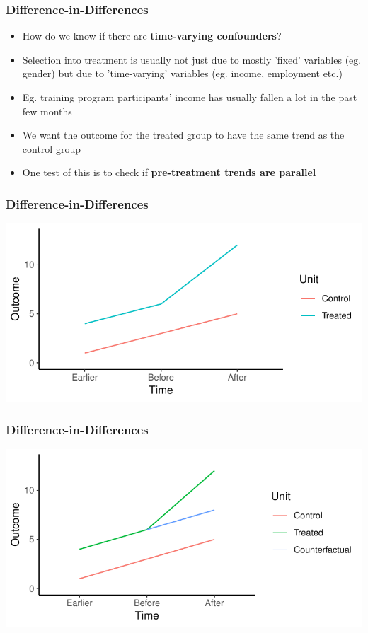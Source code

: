 \documentclass[xcolor=x11names,compress]{beamer}\usepackage[]{graphicx}\usepackage[]{color}
\makeatletter
\def\maxwidth{ %
  \ifdim\Gin@nat@width>\linewidth
    \linewidth
  \else
    \Gin@nat@width
  \fi
}
\newenvironment{knitrout}{}{} %
\renewcommand{\(}{\begin{columns}}
\renewcommand{\)}{\end{columns}}
\newcommand{\<}[1]{\begin{column}{#1}}
\renewcommand{\>}{\end{column}}
\makeatother
\begin{document}
\begin{frame}
\frametitle{Difference-in-Differences}
\begin{itemize}
\item How do we know if there are \textbf{time-varying confounders}?
\pause
\item Selection into treatment is usually not just due to mostly 'fixed' variables (eg. gender) but due to 'time-varying' variables (eg. income, employment etc.)
\pause
\item Eg. training program participants' income has usually fallen a lot in the past few months
\pause
\item We want the outcome for the treated group to have the same trend as the control group
\pause
\item One test of this is to check if \textbf{pre-treatment trends are parallel}
\end{itemize}
\end{frame}

\begin{frame}
\frametitle{Difference-in-Differences}
\begin{knitrout}
\color{fgcolor}
\includegraphics[width=\maxwidth]{figure/DinD_chart6-1} 

\end{knitrout}
\end{frame}

\begin{frame}
\frametitle{Difference-in-Differences}
\begin{knitrout}
\color{fgcolor}
\includegraphics[width=\maxwidth]{figure/DinD_chart7-1} 

\end{knitrout}
\end{frame}
\end{document}
